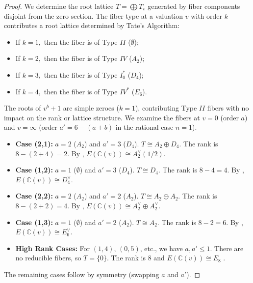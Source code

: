 \documentclass[11pt]{amsart}
\newcommand{\CC}{{\mathbb C}}
\numberwithin{equation}{section}
\numberwithin{table}{section}
\newcommand\<{\langle}
\begin{document}
\begin{proof}
	We determine the root lattice $T = \bigoplus T_v$ generated by fiber components disjoint from the zero section. The fiber type at a valuation $v$ with order $k$ contributes a root lattice determined by Tate's Algorithm:
	\begin{itemize}
	\item		If $k=1,$ then the fiber is of Type $II$ ($\emptyset$); 	 
	\item		If	 $k=2,$ then the fiber is of Type $IV$ ($A_2$);
	\item		If	 $k=3,$ then the fiber is of Type $I_0^*$ ($D_4$);
	\item		If	 $k=4, $ then the fiber is of Type $IV^*$ ($E_6$).
		\end{itemize}
		
	The roots of $v^b+1$ are simple zeroes ($k=1$), contributing Type $II$ fibers with no impact on the rank or lattice structure. We examine the fibers at $v=0$ (order $a$) and $v=\infty$ (order $a' = 6-(a+b)$ in the rational case $n=1$).
	
	\begin{itemize}

		\item \textbf{Case (2,1):} $a=2$ ($A_2$) and $a'=3$ ($D_4$). $T \cong A_2 \oplus D_4$. The rank is $8 - (2+4) = 2$. By \cite[Table 8.2, No. 32]{Schuett2019}, $E(\CC(v)) \cong A_2^\vee(1/2)$.
		
		\item \textbf{Case (1,2):} $a=1$ ($\emptyset$) and $a'=3$ ($D_4$). $T \cong D_4$. The rank is $8 - 4 = 4$. By \cite[Table 8.2, No. 9]{Schuett2019}, $E(\CC(v)) \cong D_4^\vee$.
		
		\item \textbf{Case (2,2):} $a=2$ ($A_2$) and $a'=2$ ($A_2$). $T \cong A_2 \oplus A_2$. The rank is $8 - (2+2) = 4$. By \cite[Table 8.2, No. 11]{Schuett2019}, $E(\CC(v)) \cong A_2^\vee \oplus A_2^\vee$.
		
		\item \textbf{Case (1,3):} $a=1$ ($\emptyset$) and $a'=2$ ($A_2$). $T \cong A_2$. The rank is $8 - 2 = 6$. By \cite[Table 8.2, No. 3]{Schuett2019}, $E(\CC(v)) \cong E_6^\vee$.
		
		\item \textbf{High Rank Cases:} For $(1,4)$, $(0,5)$, etc., we have $a, a' \leq 1$. There are no reducible fibers, so $T = \{0\}$. The rank is $8$ and $E(\CC(v)) \cong E_8$ \cite[Table 8.2, No. 1]{Schuett2019}.
	\end{itemize}
	The remaining cases follow by symmetry (swapping $a$ and $a'$).
\end{proof}
\end{document}
